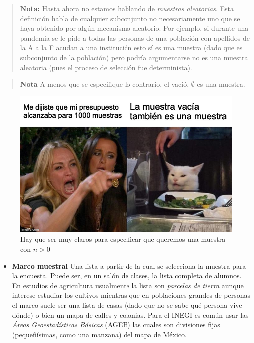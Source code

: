 \documentclass[
]{book}
\providecommand{\tightlist}{%
  \setlength{\itemsep}{0pt}\setlength{\parskip}{0pt}}
\begin{document}
\begin{quote}
\textbf{Nota:} Hasta ahora no estamos hablando de \emph{muestras aleatorias}. Esta definición habla de cualquier subconjunto no necesariamente uno que se haya obtenido por algún mecanismo aleatorio. Por ejemplo, si durante una pandemia se le pide a todas las personas de una población con apellidos de la A a la F acudan a una institución esto sí es una muestra (dado que es subconjunto de la población) pero podría argumentarse no es una muestra aleatoria (pues el proceso de selección fue determinista).
\end{quote}

\begin{quote}
\textbf{Nota} A menos que se especifique lo contrario, el vació, \(\emptyset\) es una muestra.
\end{quote}

\begin{figure}
\centering
\includegraphics{images/muestravacia.jpg}
\caption{Hay que ser muy claros para especificar que queremos una muestra con \(n >0\)}
\end{figure}

\begin{itemize}
\tightlist
\item
  \textbf{Marco muestral} Una lista a partir de la cual se selecciona la muestra para la encuesta. Puede ser, en un salón de clases, la lista completa de alumnos. En estudios de agricultura usualmente la lista son \emph{parcelas de tierra} aunque interese estudiar los cultivos mientras que en poblaciones grandes de personas el marco suele ser una lista de casas (dado que no se sabe qué persona vive dónde) o bien un mapa de calles y colonias. Para el INEGI es común usar las \emph{Áreas Geoestadísticas Básicas} (AGEB) las cuales son divisiones fijas (pequeñísimas, como una manzana) del mapa de México.
\end{itemize}
\end{document}
